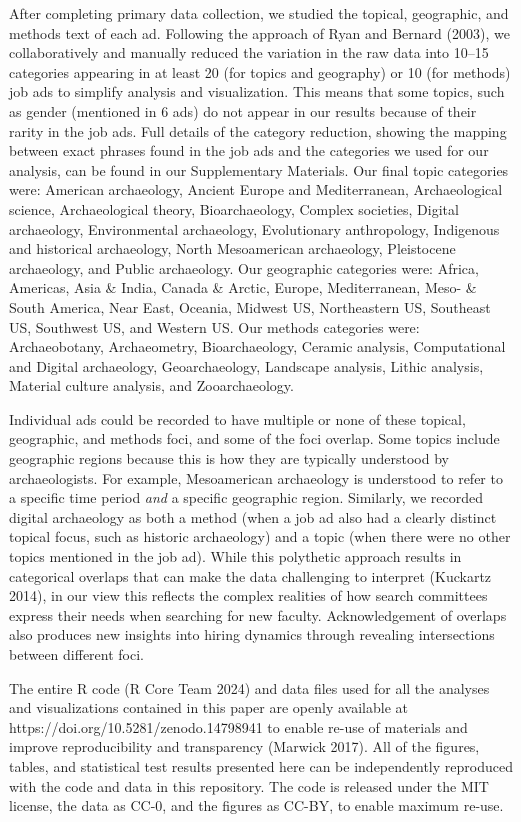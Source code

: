\documentclass[
  12pt,
]{article}
\begin{document}
After completing primary data collection, we studied the topical,
geographic, and methods text of each ad. Following the approach of Ryan
and Bernard (2003), we collaboratively and manually reduced the
variation in the raw data into 10--15 categories appearing in at least
20 (for topics and geography) or 10 (for methods) job ads to simplify
analysis and visualization. This means that some topics, such as gender
(mentioned in 6 ads) do not appear in our results because of their
rarity in the job ads. Full details of the category reduction, showing
the mapping between exact phrases found in the job ads and the
categories we used for our analysis, can be found in our Supplementary
Materials. Our final topic categories were: American archaeology,
Ancient Europe and Mediterranean, Archaeological science, Archaeological
theory, Bioarchaeology, Complex societies, Digital archaeology,
Environmental archaeology, Evolutionary anthropology, Indigenous and
historical archaeology, North Mesoamerican archaeology, Pleistocene
archaeology, and Public archaeology. Our geographic categories were:
Africa, Americas, Asia \& India, Canada \& Arctic, Europe,
Mediterranean, Meso- \& South America, Near East, Oceania, Midwest US,
Northeastern US, Southeast US, Southwest US, and Western US. Our methods
categories were: Archaeobotany, Archaeometry, Bioarchaeology, Ceramic
analysis, Computational and Digital archaeology, Geoarchaeology,
Landscape analysis, Lithic analysis, Material culture analysis, and
Zooarchaeology.

Individual ads could be recorded to have multiple or none of these
topical, geographic, and methods foci, and some of the foci overlap.
Some topics include geographic regions because this is how they are
typically understood by archaeologists. For example, Mesoamerican
archaeology is understood to refer to a specific time period \emph{and}
a specific geographic region. Similarly, we recorded digital archaeology
as both a method (when a job ad also had a clearly distinct topical
focus, such as historic archaeology) and a topic (when there were no
other topics mentioned in the job ad). While this polythetic approach
results in categorical overlaps that can make the data challenging to
interpret (Kuckartz 2014), in our view this reflects the complex
realities of how search committees express their needs when searching
for new faculty. Acknowledgement of overlaps also produces new insights
into hiring dynamics through revealing intersections between different
foci.

The entire R code (R Core Team 2024) and data files used for all the
analyses and visualizations contained in this paper are openly available
at https://doi.org/10.5281/zenodo.14798941 to enable re-use of materials
and improve reproducibility and transparency (Marwick 2017). All of the
figures, tables, and statistical test results presented here can be
independently reproduced with the code and data in this repository. The
code is released under the MIT license, the data as CC-0, and the
figures as CC-BY, to enable maximum re-use.
\end{document}
